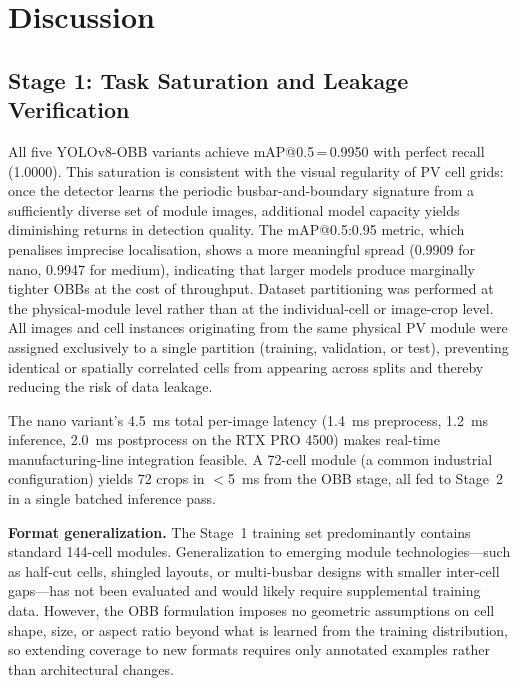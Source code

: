 \documentclass[conference]{IEEEtran}
\begin{document}
\section{Discussion}
\label{sec:discussion}

\subsection{Stage 1: Task Saturation and Leakage Verification}

All five YOLOv8-OBB variants achieve mAP@0.5\,=\,0.9950 with perfect recall (1.0000). This saturation is consistent with the visual regularity of PV cell grids: once the detector learns the periodic busbar-and-boundary signature from a sufficiently diverse set of module images, additional model capacity yields diminishing returns in detection quality. The mAP@0.5:0.95 metric, which penalises imprecise localisation, shows a more meaningful spread (0.9909 for nano, 0.9947 for medium), indicating that larger models produce marginally tighter OBBs at the cost of throughput. Dataset partitioning was performed at the physical-module level rather than at the individual-cell or image-crop level. All images and cell instances originating from the same physical PV module were assigned exclusively to a single partition (training, validation, or test), preventing identical or spatially correlated cells from appearing across splits and thereby reducing the risk of data leakage.

The nano variant's 4.5~ms total per-image latency (1.4~ms preprocess, 1.2~ms inference, 2.0~ms postprocess on the RTX PRO 4500) makes real-time manufacturing-line integration feasible. A 72-cell module (a common industrial configuration) yields 72 crops in $<$5~ms from the OBB stage, all fed to Stage~2 in a single batched inference pass.

\textbf{Format generalization.} The Stage~1 training set predominantly contains standard 144-cell modules. Generalization to emerging module technologies---such as half-cut cells, shingled layouts, or multi-busbar designs with smaller inter-cell gaps---has not been evaluated and would likely require supplemental training data. However, the OBB formulation imposes no geometric assumptions on cell shape, size, or aspect ratio beyond what is learned from the training distribution, so extending coverage to new formats requires only annotated examples rather than architectural changes.
\end{document}
